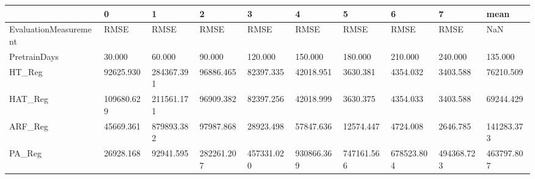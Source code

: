 \begin{tabular}{llllllllll}
\toprule
{} &          0 &          1 &          2 &          3 &          4 &          5 &          6 &          7 &       mean \\
\midrule
EvaluationMeasurement &       RMSE &       RMSE &       RMSE &       RMSE &       RMSE &       RMSE &       RMSE &       RMSE &        NaN \\
PretrainDays          &     30.000 &     60.000 &     90.000 &    120.000 &    150.000 &    180.000 &    210.000 &    240.000 &    135.000 \\
HT\_Reg                &  92625.930 & 284367.391 &  96886.465 &  82397.335 &  42018.951 &   3630.381 &   4354.032 &   3403.588 &  76210.509 \\
HAT\_Reg               & 109680.629 & 211561.171 &  96909.382 &  82397.256 &  42018.999 &   3630.375 &   4354.033 &   3403.588 &  69244.429 \\
ARF\_Reg               &  45669.361 & 879893.382 &  97987.868 &  28923.498 &  57847.636 &  12574.447 &   4724.008 &   2646.785 & 141283.373 \\
PA\_Reg                &  26928.168 &  92941.595 & 282261.207 & 457331.020 & 930866.369 & 747161.566 & 678523.804 & 494368.723 & 463797.807 \\
\bottomrule
\end{tabular}
